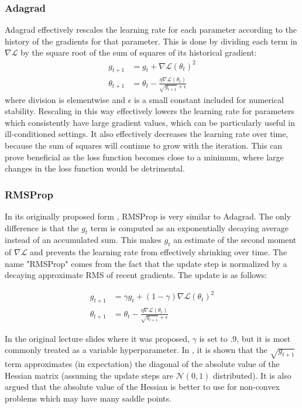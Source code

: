 \subsubsection{Adagrad}

Adagrad \cite{duchi2011adaptive} effectively rescales the learning rate for each parameter according to the history of the gradients for that parameter.
This is done by dividing each term in $\nabla \mathcal{L}$ by the square root of the sum of squares of its historical gradient:
\begin{align}
g_{t + 1} &= g_t + \nabla \mathcal{L}(\theta_t)^2 \\
\theta_{t + 1} &= \theta_t - \frac{\eta\nabla \mathcal{L}(\theta_t)}{\sqrt{g_{t + 1}} + \epsilon}
\end{align}
where division is elementwise and $\epsilon$ is a small constant included for numerical stability.
Rescaling in this way effectively lowers the learning rate for parameters which consistently have large gradient values, which can be particularly useful in ill-conditioned settings.
It also effectively decreases the learning rate over time, because the sum of squares will continue to grow with the iteration.
This can prove beneficial as the loss function becomes close to a minimum, where large changes in the loss function would be detrimental.

\subsubsection{RMSProp}
\label{sec:rmsprop}

In its originally proposed form \cite{tieleman2012lecture}, RMSProp is very similar to Adagrad.
The only difference is that the $g_t$ term is computed as an exponentially decaying average instead of an accumulated sum.
This makes $g_t$ an estimate of the second moment of $\nabla \mathcal{L}$ and prevents the learning rate from effectively shrinking over time.
The name "RMSProp" comes from the fact that the update step is normalized by a decaying approximate RMS of recent gradients.
The update is as follows:

\begin{align}
g_{t + 1} &= \gamma g_t + (1 - \gamma) \nabla \mathcal{L}(\theta_t)^2 \\
\theta_{t + 1} &= \theta_t - \frac{\eta\nabla \mathcal{L}(\theta_t)}{\sqrt{g_{t + 1}} + \epsilon}
\end{align}

In the original lecture slides where it was proposed, $\gamma$ is set to $.9$, but it is most commonly treated as a variable hyperparameter.
In \cite{dauphin2015rmsprop}, it is shown that the $\sqrt{g_{t + 1}}$ term approximates (in expectation) the diagonal of the absolute value of the Hessian matrix (assuming the update steps are $\mathcal{N}(0, 1)$ distributed).
It is also argued that the absolute value of the Hessian is better to use for non-convex problems which may have many saddle points.

